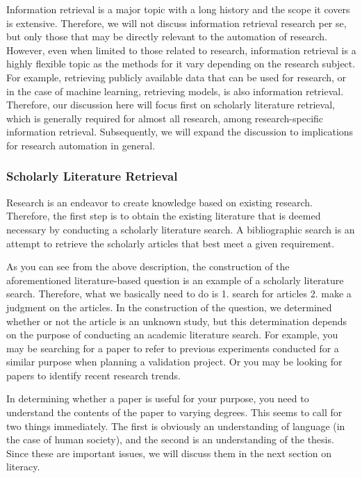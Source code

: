 \documentclass{book}
\begin{document}
Information retrieval is a major topic with a long history and the scope it covers is extensive. Therefore, we will not discuss information retrieval research per se, but only those that may be directly relevant to the automation of research. However, even when limited to those related to research, information retrieval is a highly flexible topic as the methods for it vary depending on the research subject. For example, retrieving publicly available data that can be used for research, or in the case of machine learning, retrieving models, is also information retrieval. Therefore, our discussion here will focus first on scholarly literature retrieval, which is generally required for almost all research, among research-specific information retrieval. Subsequently, we will expand the discussion to implications for research automation in general.

\subsubsection{Scholarly Literature Retrieval}
Research is an endeavor to create knowledge based on existing research. Therefore, the first step is to obtain the existing literature that is deemed necessary by conducting a scholarly literature search. A bibliographic search is an attempt to retrieve the scholarly articles that best meet a given requirement.

As you can see from the above description, the construction of the aforementioned literature-based question is an example of a scholarly literature search. Therefore, what we basically need to do is 1. search for articles 2. make a judgment on the articles. In the construction of the question, we determined whether or not the article is an unknown study, but this determination depends on the purpose of conducting an academic literature search. For example, you may be searching for a paper to refer to previous experiments conducted for a similar purpose when planning a validation project. Or you may be looking for papers to identify recent research trends.

In determining whether a paper is useful for your purpose, you need to understand the contents of the paper to varying degrees. This seems to call for two things immediately. The first is obviously an understanding of language (in the case of human society), and the second is an understanding of the thesis. Since these are important issues, we will discuss them in the next section on literacy.
\end{document}
